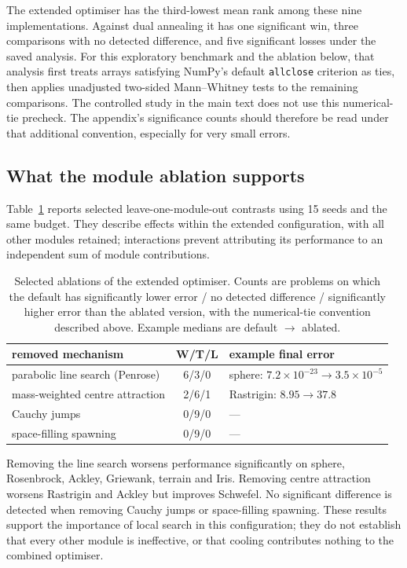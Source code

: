 \documentclass[10pt,a4paper]{article}
\begin{document}
The extended optimiser has the third-lowest mean rank among these nine
implementations. Against dual annealing it has one significant win, three
comparisons with no detected difference, and five significant losses under the
saved analysis. For this exploratory benchmark and the ablation below, that
analysis first treats arrays satisfying NumPy's default \texttt{allclose}
criterion as ties, then applies unadjusted two-sided Mann--Whitney tests to the
remaining comparisons. The controlled study in the main text does not use this
numerical-tie precheck. The appendix's significance counts should therefore be
read under that additional convention, especially for very small errors.

\subsection{What the module ablation supports}

Table~\ref{tab:ablation} reports selected leave-one-module-out contrasts using
15 seeds and the same budget. They describe effects within the extended
configuration, with all other modules retained; interactions prevent attributing
its performance to an independent sum of module contributions.

\begin{table}[htbp]
\centering
\small
\caption{Selected ablations of the extended optimiser. Counts are problems on
which the default has significantly lower error / no detected difference /
significantly higher error than the ablated version, with the numerical-tie
convention described above. Example medians are default $\to$ ablated.}
\label{tab:ablation}
\begin{tabularx}{\linewidth}{@{}Xcl@{}}
\toprule
removed mechanism & W/T/L & example final error \\
\midrule
parabolic line search (Penrose) & 6/3/0 & sphere: $7.2\times10^{-23}\to3.5\times10^{-5}$ \\
mass-weighted centre attraction & 2/6/1 & Rastrigin: $8.95\to37.8$ \\
Cauchy jumps & 0/9/0 & --- \\
space-filling spawning & 0/9/0 & --- \\
\bottomrule
\end{tabularx}
\end{table}

Removing the line search worsens performance significantly on sphere,
Rosenbrock, Ackley, Griewank, terrain and Iris. Removing centre attraction
worsens Rastrigin and Ackley but improves Schwefel. No significant difference
is detected when removing Cauchy jumps or space-filling spawning. These results
support the importance of local search in this configuration; they do not
establish that every other module is ineffective, or that cooling contributes
nothing to the combined optimiser.
\end{document}
